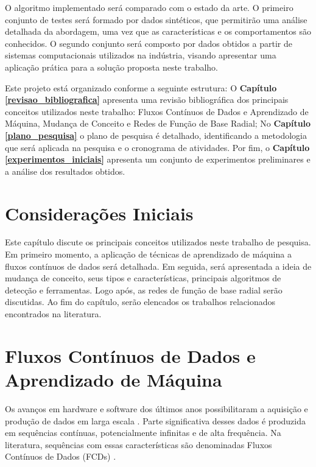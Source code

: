 \documentclass[qual, classic, a4paper]{ufbathesis}
\begin{document}
O algoritmo implementado será comparado com o estado da arte. 
O primeiro conjunto de testes será formado por dados sintéticos, que permitirão uma análise detalhada da abordagem, uma vez que as características e os comportamentos são conhecidos. 
O segundo conjunto será composto por dados obtidos a partir de sistemas computacionais utilizados na indústria,
visando apresentar uma aplicação prática para a solução proposta neste trabalho. 

Este projeto está organizado conforme a seguinte estrutura: 
O \textbf{Capítulo \ref{revisao_bibliografica}} apresenta uma revisão bibliográfica dos principais conceitos utilizados neste trabalho: Fluxos Contínuos de Dados e Aprendizado de Máquina, Mudança de Conceito e Redes de Função de Base Radial; 
No \textbf{Capítulo \ref{plano_pesquisa}} o plano de pesquisa é detalhado, 
identificando a metodologia que será aplicada na pesquisa e o cronograma de atividades. 
Por fim, o \textbf{Capítulo \ref{experimentos_iniciais}} 
apresenta um conjunto de experimentos preliminares e a análise dos resultados obtidos.

 \label{revisao_bibliografica}
\section{Considerações Iniciais}

Este capítulo discute os principais conceitos utilizados neste trabalho de pesquisa.
Em primeiro momento, a aplicação de técnicas de aprendizado de máquina a fluxos contínuos de dados será detalhada.
Em seguida, será apresentada a ideia de mudança de conceito, seus tipos e características, principais algoritmos de detecção e ferramentas.
Logo após, as redes de função de base radial serão discutidas.
Ao fim do capítulo, serão elencados os trabalhos relacionados encontrados na literatura.

\section{Fluxos Contínuos de Dados e Aprendizado de Máquina}

Os avanços em hardware e software dos últimos anos possibilitaram a aquisição e produção de dados em larga escala \cite{Aggarwal:2003:FCE:1315451.1315460}.
Parte significativa desses dados é produzida em sequências contínuas, potencialmente infinitas e de alta frequência.
Na literatura, sequências com essas características são denominadas Fluxos Contínuos de Dados (FCDs) \cite{Aggarwal:2003:FCE:1315451.1315460, Gama:2010:KDD:1855075, GamaMCR04}.
\end{document}
